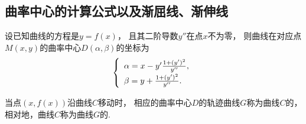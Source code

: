 \subsection{曲率中心的计算公式以及渐屈线、渐伸线}
设已知曲线的方程是\(y=f(x)\)，
且其二阶导数\(y''\)在点\(x\)不为零，
则曲线在对应点\(M(x,y)\)的曲率中心\(D(\alpha,\beta)\)的坐标为
\begin{equation}
	\left\{ \def\arraystretch{1.5} \begin{array}{l}
		\alpha = x - y' \frac{1 + (y')^2}{y''}, \\
		\beta = y + \frac{1 + (y')^2}{y''}.
	\end{array} \right.
\end{equation}

当点\((x,f(x))\)沿曲线\(C\)移动时，
相应的曲率中心\(D\)的轨迹曲线\(G\)称为曲线\(C\)的，
相对地，曲线\(C\)称为曲线\(G\)的.
